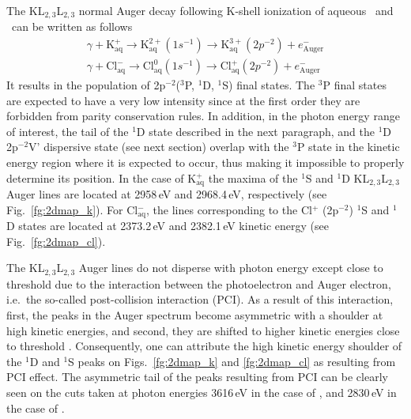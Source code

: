 The KL$_{2,3}$L$_{2,3}$ normal Auger decay following K-shell ionization of aqueous \ki~and \cli~can be written as follows
%
\begin{align*}
\gamma + \text{K}^{+}_{\text{aq}} \rightarrow \text{K}^{2+}_{\text{aq}} (1s^{-1}) \rightarrow \text{K}^{3+}_{\text{aq}} (2p^{-2}) + e^{-}_{\text{Auger}}\\
\gamma + \text{Cl}^{-}_{\text{aq}} \rightarrow \text{Cl}^{0}_{\text{aq}} (1s^{-1}) \rightarrow \text{Cl}^{+}_{\text{aq}}(2p^{-2}) + e^{-}_{\text{Auger}}
\end{align*}
%
It results in the population of 2p$^{-2}$($^3$P, $^1$D, $^1$S) final states. 
The $^3$P final states are expected to have a very low intensity since at the first order they are forbidden from parity conservation rules. In addition, in the photon energy range of interest, the tail of the $^1$D state described in the next paragraph, and the $^1$D 2p$^{-2}$V' dispersive state (see next section) {\color{red}overlap with the $^3$P state in the kinetic energy region where it is expected to occur, thus making it impossible to properly determine its position.} In the case of K$^{+}_{\text{aq}}$ the maxima of the $^1$S and $^1$D KL$_{2,3}$L$_{2,3}$ Auger lines are located at 2958\,eV and 2968.4\,eV, respectively (see Fig.\ \ref{fg:2dmap_k}). For Cl$^{-}_{\text{aq}}$, the lines corresponding to the Cl$^{+}$ (2p$^{-2}$) $^1$S and $^1$D states are located at 2373.2\,eV and 2382.1\,eV kinetic energy (see Fig.\ \ref{fg:2dmap_cl}).


The KL$_{2,3}$L$_{2,3}$ Auger lines do not disperse with photon energy except close to threshold due to the interaction between the photoelectron and Auger electron, i.e.\ the so-called post-collision interaction (PCI). As a result of this interaction, first, the peaks in the Auger spectrum become asymmetric with a shoulder at high kinetic energies, and second, they are shifted to higher kinetic energies close to threshold \citep{russek86:911,guillemin15:012503}. Consequently, one can attribute the high kinetic energy shoulder of the $^1$D and $^1$S peaks on Figs.\ \ref{fg:2dmap_k} and \ref{fg:2dmap_cl} as resulting from PCI effect. {\color{red}The asymmetric tail of the peaks resulting from PCI can be clearly seen on the cuts taken at photon energies 3616\,eV in the case of \ki, and 2830\,eV in the case of \cli.}


